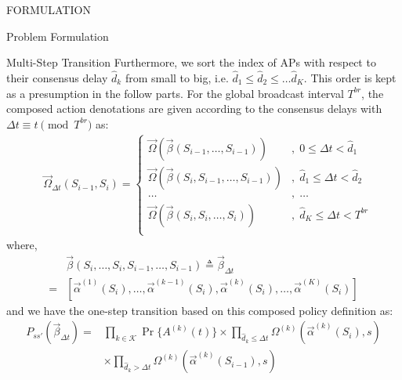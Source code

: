 \documentclass[10pt, conference, letterpaper]{IEEEtran}
\begin{document}
\begin{section}{FORMULATION}
\begin{subsection}{Problem Formulation}
\begin{subsubsection}{Multi-Step Transition}
                Furthermore, we sort the index of APs with respect to their consensus delay $\hat{d}_k$ from small to big, i.e. $\hat{d}_1 \leq \hat{d}_2 \leq \dots \hat{d}_{K}$. This order is kept as a presumption in the follow parts. For the global broadcast interval $T^{br}$, the composed action denotations are given according to the consensus delays with $\Delta{t} \equiv t \pmod{T^{br}}$ as:
                \begin{align}
                    &\vec{\Omega}_{\Delta{t}}(S_{i-1},S_{i}) = 
                    \begin{cases}
                        \vec{\Omega}(\vec{\beta}(S_{i-1}, \dots, S_{i-1})) &,\; 0 \leq \Delta{t} < \hat{d}_1 \\
                        \vec{\Omega}(\vec{\beta}(S_{i}, S_{i-1}, \dots, S_{i-1})) &,\; \hat{d}_1 \leq \Delta{t}< \hat{d}_2 \\
                        \dots &,\; \dots \\
                        \vec{\Omega}(\vec{\beta}(S_{i}, S_{i}, \dots, S_{i})) &,\; \hat{d}_{K} \leq \Delta{t} < T^{br} \\
                    \end{cases}
                \end{align}
                where,
                \begin{align}
                    & \vec{\beta}(S_i,\dots, S_i,S_{i-1}, \dots,S_{i-1}) \triangleq \vec{\beta}_{\Delta{t}}
                    \nonumber\\
                    = & [\vec{\alpha}^{(1)}(S_i),\dots,\vec{\alpha}^{(k-1)}(S_i),
                        \vec{\alpha}^{(k)}(S_i),\dots,\vec{\alpha}^{(K)}(S_i)]
                \end{align}
                and we have the one-step transition based on this composed policy definition as:
                \begin{align}
                    P_{ss'}(\vec{\beta}_{\Delta{t}}) =& \prod_{k\in\mathcal{K}}{\Pr\{A^{(k)}(t)\}} \times \prod_{\hat{d}_k \leq \Delta{t}} { \Omega^{(k)}(\vec{\alpha}^{(k)}(S_{i}), s)}
                    \nonumber \\
                    & \times \prod_{\hat{d}_k > \Delta{t}} { \Omega^{(k)}(\vec{\alpha}^{(k)}(S_{i-1}), s) }
                \end{align}


\end{subsubsection}
\end{subsection}
\end{section}
\end{document}

